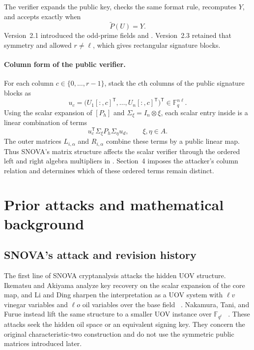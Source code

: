 \documentclass[11pt]{article}
\newcommand{\F}{\mathbb F}
\newcommand{\transpose}{\mathsf T}
\newcommand{\SNOVA}{\textsf{SNOVA}}
\begin{document}
The verifier expands the public key, checks the same format rule, recomputes
$Y$, and accepts exactly when
\begin{equation}
 \widetilde P(U)=Y.
 \label{eq:scheme-verification}
\end{equation}
Version~2.1 introduced the odd-prime fields and
.  Version~2.3 retained that symmetry and
allowed $r\ne\ell$, which gives rectangular signature blocks.

\paragraph{Column form of the public verifier.}
For each column $c\in\{0,\ldots,r-1\}$, stack the $c$th columns of the public
signature blocks as
\begin{equation}
 u_c=\bigl(U_1[:,c]^\transpose,\ldots,U_n[:,c]^\transpose\bigr)^\transpose
 \in\F_q^{n\ell}.
 \label{eq:scheme-stacked-columns}
\end{equation}
Using the scalar expansion of $[P_h]$ and
$\Sigma_\xi=I_n\otimes\xi$, each scalar entry inside
 is a linear combination of terms
\begin{equation}
 u_c^\transpose\Sigma_\xi P_h\Sigma_\eta u_d,
 \qquad \xi,\eta\in A.
 \label{eq:scheme-power-pair}
\end{equation}
The outer matrices $L_{i,\alpha}$ and $R_{i,\alpha}$ combine these terms by a
public linear map.  Thus SNOVA's matrix structure affects the scalar verifier
through the ordered left and right algebra multipliers in
.  Section~4 imposes the attacker's column relation
and determines which of these ordered terms remain distinct.

\section{Prior attacks and mathematical background}\label{sec:background}

\subsection{SNOVA's attack and revision history}

The first line of \SNOVA{} cryptanalysis attacks the hidden UOV structure.
Ikematsu and Akiyama analyze key recovery on the scalar expansion of the core
map, and Li and Ding sharpen the interpretation as a UOV system with
$\ell v$ vinegar variables and $\ell o$ oil variables over the base field
~\cite{IkematsuAkiyama2024,LiDing2024}.  Nakamura, Tani, and Furue instead
lift the same structure to a smaller UOV instance over $\F_{q^\ell}$
~\cite{NakamuraEtAl2025}.  These attacks seek the hidden oil space or an
equivalent signing key.  They concern the original characteristic-two
construction and do not use the symmetric public matrices introduced later.
\end{document}
